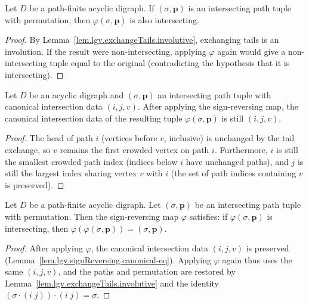 \begin{lemma}
\label{lem.lgv.signReversing.isIntersecting}
\leanhelper
\leanok
Let $D$ be a path-finite acyclic digraph.  If $(\sigma, \mathbf{p})$
is an intersecting path tuple with permutation, then
$\varphi(\sigma, \mathbf{p})$ is also intersecting.
\end{lemma}

\begin{proof}
\leanok
By Lemma~\ref{lem.lgv.exchangeTails.involutive}, exchanging tails
is an involution.  If the result were non-intersecting, applying
$\varphi$ again would give a non-intersecting tuple equal to the
original (contradicting the hypothesis that it is intersecting).
\end{proof}

\begin{lemma}
\label{lem.lgv.signReversing.canonical-eq}
Let $D$ be an acyclic digraph and $(\sigma, \mathbf{p})$ an
intersecting path tuple with canonical intersection data $(i, j, v)$.
After applying the sign-reversing map, the canonical intersection data
of the resulting tuple $\varphi(\sigma, \mathbf{p})$ is still $(i, j, v)$.
\end{lemma}

\begin{proof}
The head of path $i$ (vertices before $v$, inclusive) is unchanged by
the tail exchange, so $v$ remains the first crowded vertex on path $i$.
Furthermore, $i$ is still the smallest crowded path index (indices
below $i$ have unchanged paths), and $j$ is still the largest index
sharing vertex $v$ with $i$ (the set of path indices containing $v$
is preserved).
\end{proof}

\begin{lemma}
\label{lem.lgv.signReversing.involutive}
\leanhelper
\leanok
Let $D$ be a path-finite acyclic digraph.  Let $(\sigma, \mathbf{p})$
be an intersecting path tuple with permutation.  Then the sign-reversing
map $\varphi$ satisfies: if $\varphi(\sigma, \mathbf{p})$ is
intersecting, then $\varphi(\varphi(\sigma, \mathbf{p})) = (\sigma, \mathbf{p})$.
\end{lemma}

\begin{proof}
\leanok
After applying $\varphi$, the canonical intersection data $(i, j, v)$ is
preserved (Lemma~\ref{lem.lgv.signReversing.canonical-eq}).
Applying $\varphi$ again thus uses
the same $(i, j, v)$, and the paths and permutation are restored by
Lemma~\ref{lem.lgv.exchangeTails.involutive} and the identity
$(\sigma \cdot (i\; j)) \cdot (i\; j) = \sigma$.
\end{proof}

